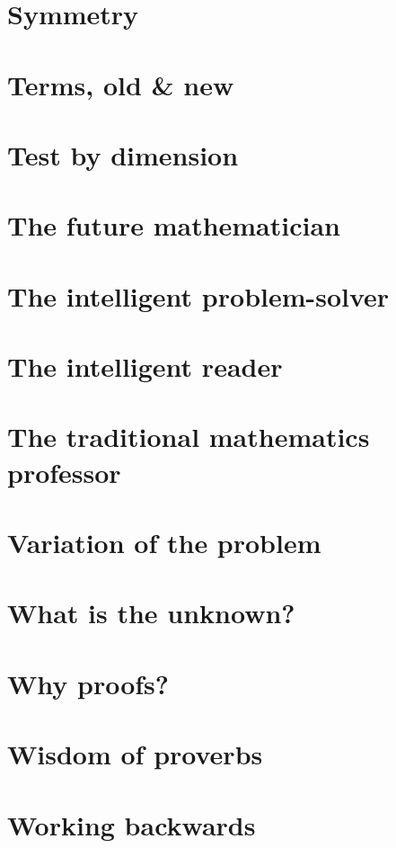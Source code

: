 \documentclass[oneside]{book}
\numberwithin{equation}{section}
\begin{document}
\section*{Symmetry}

\section*{Terms, old \& new}

\section*{Test by dimension}

\section*{The future mathematician}

\section*{The intelligent problem-solver}

\section*{The intelligent reader}

\section*{The traditional mathematics professor}

\section*{Variation of the problem}

\section*{What is the unknown?}

\section*{Why proofs?}

\section*{Wisdom of proverbs}

\section*{Working backwards}
\end{document}
